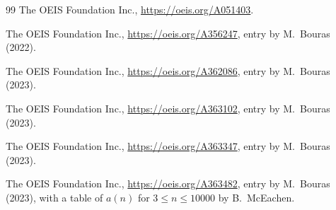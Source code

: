 \documentclass[11pt]{amsart}
\theoremstyle{plain}
\theoremstyle{definition}
\begin{document}
\begin{thebibliography}{99}
The OEIS Foundation Inc., \url{https://oeis.org/A051403}.

The OEIS Foundation Inc., \url{https://oeis.org/A356247}, entry by M.~Bouras (2022).

The OEIS Foundation Inc., \url{https://oeis.org/A362086}, entry by M.~Bouras (2023).

The OEIS Foundation Inc., \url{https://oeis.org/A363102}, entry by M.~Bouras (2023).

The OEIS Foundation Inc., \url{https://oeis.org/A363347}, entry by M.~Bouras (2023).

The OEIS Foundation Inc., \url{https://oeis.org/A363482}, entry by M.~Bouras (2023), with a table of $a(n)$ for $3\le n\le10000$ by B.~McEachen.

\end{thebibliography}
\end{document}
